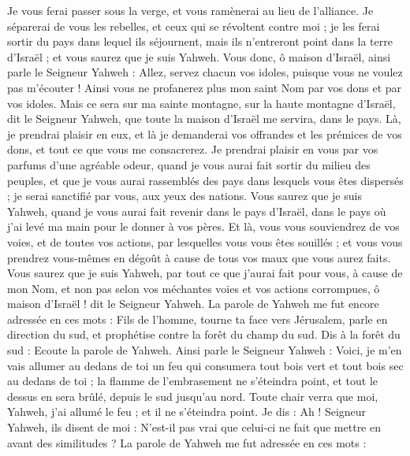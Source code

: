 \begin{multicols}{2}
Je vous ferai passer sous la verge, et vous ramènerai au lieu de l'alliance.
Je séparerai de vous les rebelles, et ceux qui se révoltent contre moi ; je les ferai sortir du pays dans lequel ils séjournent, mais ils n'entreront point dans la terre d'Israël ; et vous saurez que je suis Yahweh.
Vous donc, ô maison d'Israël, ainsi parle le Seigneur Yahweh : Allez, servez chacun vos idoles, puisque vous ne voulez pas m’écouter ! Ainsi vous ne profanerez plus mon saint Nom par vos dons et par vos idoles.
Mais ce sera sur ma sainte montagne, sur la haute montagne d'Israël, dit le Seigneur Yahweh, que toute la maison d'Israël me servira, dans le pays. Là, je prendrai plaisir en eux, et là je demanderai vos offrandes et les prémices de vos dons, et tout ce que vous me consacrerez.
Je prendrai plaisir en vous par vos parfums d’une agréable odeur, quand je vous aurai fait sortir du milieu des peuples, et que je vous aurai rassemblés des pays dans lesquels vous êtes dispersés ; je serai sanctifié par vous, aux yeux des nations.
Vous saurez que je suis Yahweh, quand je vous aurai fait revenir dans le pays d'Israël, dans le pays où j'ai levé ma main pour le donner à vos pères.
Et là, vous vous souviendrez de vos voies, et de toutes vos actions, par lesquelles vous vous êtes souillés ; et vous vous prendrez vous-mêmes en dégoût à cause de tous vos maux que vous aurez faits.
Vous saurez que je suis Yahweh, par tout ce que j'aurai fait pour vous, à cause de mon Nom, et non pas selon vos méchantes voies et vos actions corrompues, ô maison d'Israël ! dit le Seigneur Yahweh.
\VerseOne{}La parole de Yahweh me fut encore adressée en ces mots :
Fils de l’homme, tourne ta face vers Jérusalem, parle en direction du sud, et prophétise contre la forêt du champ du sud.
Dis à la forêt du sud : Ecoute la parole de Yahweh. Ainsi parle le Seigneur Yahweh : Voici, je m'en vais allumer au dedans de toi un feu qui consumera tout bois vert et tout bois sec au dedans de toi ; la flamme de l'embrasement ne s'éteindra point, et tout le dessus en sera brûlé, depuis le sud jusqu'au nord.
Toute chair verra que moi, Yahweh, j'ai allumé le feu ; et il ne s'éteindra point.
Je dis : Ah ! Seigneur Yahweh, ils disent de moi : N'est-il pas vrai que celui-ci ne fait que mettre en avant des similitudes ?
La parole de Yahweh me fut adressée en ces mots :

\end{multicols}
